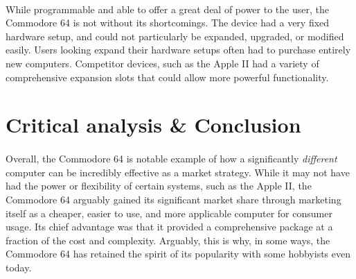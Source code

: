 \documentclass{article}
\begin{document}
\paragraph{}
While programmable and able to offer a great deal of power to the user, the Commodore 64 is not without its shortcomings. The device had a very fixed hardware setup, and could not particularly be expanded, upgraded, or modified easily. Users looking expand their hardware setups often had to purchase entirely new computers. Competitor devices, such as the Apple II had a variety of comprehensive expansion slots that could allow more powerful functionality. 

\section{Critical analysis \& Conclusion}
\paragraph{}
Overall, the Commodore 64 is notable example of how a significantly \textit{different} computer can be incredibly effective as a market strategy. While it may not have had the power or flexibility of certain systems, such as the Apple II, the Commodore 64 arguably gained its significant market share through marketing itself as a cheaper, easier to use, and more applicable computer for consumer usage. Its chief advantage was that it provided a comprehensive package at a fraction of the cost and complexity. Arguably, this is why, in some ways, the Commodore 64 has retained the spirit of its popularity with some hobbyists even today.

\pagebreak
\end{document}
